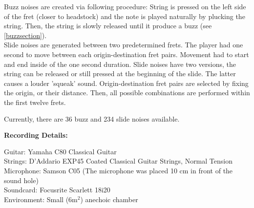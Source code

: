 Buzz noises are created via following procedure: String is pressed on the left side of the fret (closer to headstock) and the note is played naturally by plucking the string. Then, the string is slowly released until it produce a buzz (see \ref{buzzsection}).  \\

Slide noises are generated between two predetermined frets. The player had one second to move between each origin-destination fret pairs. Movement had to start and end inside of the one second duration. Slide noises have two versions, the string can be released or still pressed at the beginning of the slide. The latter causes a louder 'squeak' sound. Origin-destination fret pairs are selected by fixing the origin, or their distance. Then, all possible combinations are performed within the first twelve frets.

Currently, there are 36 buzz and 234 slide noises available.

\textbf{Recording Details:}

Guitar: Yamaha C80 Classical Guitar \\
Strings: D'Addario EXP45 Coated Classical Guitar Strings, Normal Tension \\
Microphone: Samson C05 (The microphone was placed 10 cm in front of the sound hole)\\
Soundcard: Focusrite Scarlett 18i20 \\
Environment: Small (6m$^2$) anechoic chamber \\